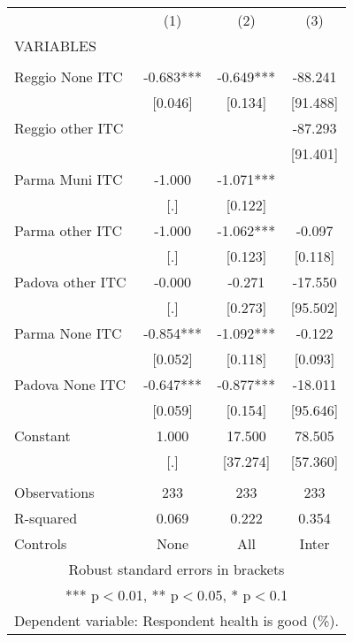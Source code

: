 \begin{tabular}{lccc} \hline
 & (1) & (2) & (3) \\
VARIABLES &  &  &  \\ \hline
 &  &  &  \\
Reggio None ITC & -0.683*** & -0.649*** & -88.241 \\
 & [0.046] & [0.134] & [91.488] \\
Reggio other ITC &  &  & -87.293 \\
 &  &  & [91.401] \\
Parma Muni ITC & -1.000 & -1.071*** &  \\
 & [.] & [0.122] &  \\
Parma other ITC & -1.000 & -1.062*** & -0.097 \\
 & [.] & [0.123] & [0.118] \\
Padova other ITC & -0.000 & -0.271 & -17.550 \\
 & [.] & [0.273] & [95.502] \\
Parma None ITC & -0.854*** & -1.092*** & -0.122 \\
 & [0.052] & [0.118] & [0.093] \\
Padova None ITC & -0.647*** & -0.877*** & -18.011 \\
 & [0.059] & [0.154] & [95.646] \\
Constant & 1.000 & 17.500 & 78.505 \\
 & [.] & [37.274] & [57.360] \\
 &  &  &  \\
Observations & 233 & 233 & 233 \\
R-squared & 0.069 & 0.222 & 0.354 \\
 Controls & None & All & Inter \\ \hline
\multicolumn{4}{c}{ Robust standard errors in brackets} \\
\multicolumn{4}{c}{ *** p$<$0.01, ** p$<$0.05, * p$<$0.1} \\
\multicolumn{4}{c}{ Dependent variable: Respondent health is good (\%).} \\
\end{tabular}
